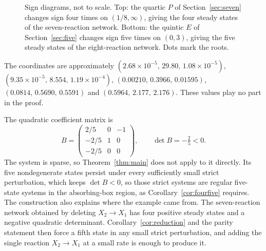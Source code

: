 \documentclass[11pt]{article}
\theoremstyle{remark}\newtheorem{remark}[theorem]{Remark}
\begin{document}
\begin{figure}[ht]
\centering
{}
\caption{Sign diagrams, not to scale. Top: the quartic $P$ of Section~\ref{sec:seven}
changes sign four times on $(1/8,\infty)$, giving the four steady states of the
seven-reaction network. Bottom: the quintic $E$ of Section~\ref{sec:five} changes sign
five times on $(0,3)$, giving the five steady states of the eight-reaction network.
Dots mark the roots.}
\label{fig:signs}
\end{figure}

The coordinates are approximately $(2.68\times10^{-5},\,29.80,\,1.08\times10^{-5})$,
$(9.35\times10^{-5},\,8.554,\,1.19\times10^{-4})$, $(0.00210,\,0.3966,\,0.01595)$,
$(0.0814,\,0.5690,\,0.5591)$ and $(0.5964,\,2.177,\,2.176)$. These values play no
part in the proof.

The quadratic coefficient matrix is
\[
 B=\begin{pmatrix}2/5&0&-1\\-2/5&1&0\\-2/5&0&0\end{pmatrix},\qquad \det B=-\tfrac25<0.
\]
The system is sparse, so Theorem~\ref{thm:main} does not apply to it directly.
Its five nondegenerate states persist under every sufficiently small strict
perturbation, which keeps $\det B<0$, so those strict systems are regular
five-state systems in the absorbing-box region, as Corollary~\ref{cor:fourfive}
requires. The construction also explains where the example came from. The
seven-reaction network obtained by deleting $X_2\to X_1$ has four positive steady
states and a negative quadratic determinant. Corollary~\ref{cor:reduction} and
the parity statement then force a fifth state in any small strict perturbation,
and adding the single reaction $X_2\to X_1$ at a small rate is enough to produce it.
\end{document}
